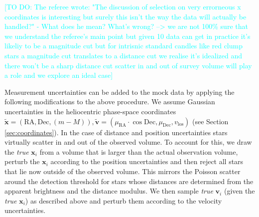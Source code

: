 \documentclass[iop,revtex4]{emulateapj}
\newcommand{\vect}[1]{\boldsymbol{#1}}
\newcommand{\HW}[1]{\textcolor{Cyan}{#1}}
\begin{document}
\begin{appendix}
\HW{[TO DO: The referee wrote: "The discussion of selection on very errorneous x coordinates is interesting but surely this isn't the way the data will actually be handled?" - What does he mean? What's wrong? --> we are not 100\% sure that we understand the referee's main point but
given 10%
data can get
in practice it's likeliy to be a magnitude cut but for intrisnic standard
candles like red clump stars a magnitude cut translates to a distance cut
we realise it's idealized and there won't be a sharp distance cut
scatter in and out of survey volume will play a role and we explore an
ideal case]}

Measurement uncertainties can be added to the mock data by applying the following modifications to the above procedure. We assume Gaussian uncertainties in the heliocentric phase-space coordinates $\tilde{\vect{x}} = (\text{RA},\text{Dec},(m-M)), \tilde{\vect{v}} = (\mu_\text{RA} \cdot \cos \text{Dec} ,\mu_\text{Dec},v_\text{los})$ (see Section \ref{sec:coordinates}). In the case of distance and position uncertainties stars virtually scatter in and out of the observed volume. To account for this, we draw the \emph{true} $\vect{x}_i$ from a volume that is larger than the actual observation volume, perturb the $\vect{x}_i$ according to the position uncertainties and then reject all stars that lie now outside of the observed volume. This mirrors the Poisson scatter around the detection threshold for stars whose distances are determined from the apparent brightness and the distance modulus. We then sample \emph{true} $\vect{v}_i$ (given the \emph{true} $\vect{x}_i$) as described above and perturb them according to the velocity uncertainties.


\end{appendix}
\end{document}
